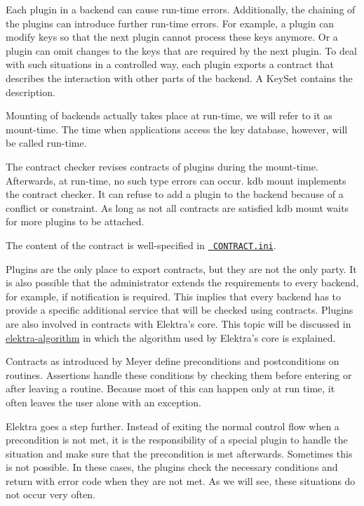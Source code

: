 Each plugin in a backend can cause run-\/time errors. Additionally, the chaining of the plugins can introduce further run-\/time errors. For example, a plugin can modify keys so that the next plugin cannot process these keys anymore. Or a plugin can omit changes to the keys that are required by the next plugin. To deal with such situations in a controlled way, each plugin exports a contract that describes the interaction with other parts of the backend. A {\ttfamily Key\+Set} contains the description.

Mounting of backends actually takes place at run-\/time, we will refer to it as mount-\/time. The time when applications access the key database, however, will be called run-\/time.

The contract checker revises contracts of plugins during the mount-\/time. Afterwards, at run-\/time, no such type errors can occur. {\ttfamily kdb mount} implements the contract checker. It can refuse to add a plugin to the backend because of a conflict or constraint. As long as not all contracts are satisfied {\ttfamily kdb mount} waits for more plugins to be attached.

The content of the contract is well-\/specified in \href{/home/mpranj/workspace/libelektra/doc/CONTRACT.ini}{\texttt{ C\+O\+N\+T\+R\+A\+C\+T.\+ini}}.

Plugins are the only place to export contracts, but they are not the only party. It is also possible that the administrator extends the requirements to every backend, for example, if notification is required. This implies that every backend has to provide a specific additional service that will be checked using contracts. Plugins are also involved in contracts with Elektra’s core. This topic will be discussed in \mbox{\hyperlink{doc_dev_algorithm_md}{elektra-\/algorithm}} in which the algorithm used by Elektra’s core is explained.

Contracts as introduced by Meyer define preconditions and postconditions on routines. Assertions handle these conditions by checking them before entering or after leaving a routine. Because most of this can happen only at run time, it often leaves the user alone with an exception.

Elektra goes a step further. Instead of exiting the normal control flow when a precondition is not met, it is the responsibility of a special plugin to handle the situation and make sure that the precondition is met afterwards. Sometimes this is not possible. In these cases, the plugins check the necessary conditions and return with error code when they are not met. As we will see, these situations do not occur very often.

